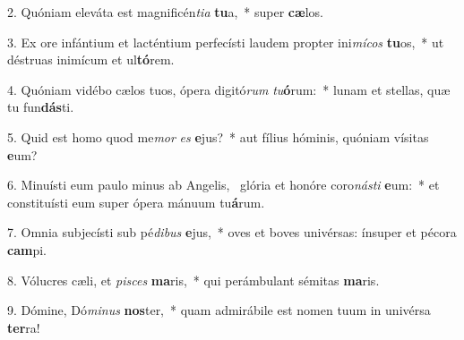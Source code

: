 2. Quóniam eleváta est magnificén\textit{ti}\textit{a} \textbf{tu}a,~*  super \textbf{cæ}los.\

3. Ex ore infántium et lacténtium perfecísti laudem propter ini\textit{mí}\textit{cos} \textbf{tu}os,~*  ut déstruas inimícum et ul\textbf{tó}rem.\

4. Quóniam vidébo cælos tuos, ópera digitó\textit{rum} \textit{tu}\textbf{ó}rum:~*  lunam et stellas, quæ tu fun\textbf{dás}ti.\

5. Quid est homo quod me\textit{mor} \textit{es} \textbf{e}jus?~*  aut fílius hóminis, quóniam vísitas \textbf{e}um?\

6. Minuísti eum paulo minus ab Angelis, \dag\  glória et honóre coro\textit{nás}\textit{ti} \textbf{e}um:~*  et constituísti eum super ópera mánuum tu\textbf{á}rum.\

7. Omnia subjecísti sub pé\textit{di}\textit{bus} \textbf{e}jus,~*  oves et boves univérsas: ínsuper et pécora \textbf{cam}pi.\

8. Vólucres cæli, et \textit{pi}\textit{sces} \textbf{ma}ris,~*  qui perámbulant sémitas \textbf{ma}ris.\

9. Dómine, Dó\textit{mi}\textit{nus} \textbf{nos}ter,~*  quam admirábile est nomen tuum in univérsa \textbf{ter}ra!\

